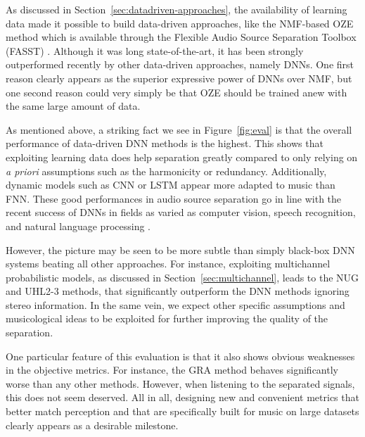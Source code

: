 As discussed in Section~\ref{sec:datadriven-approaches}, the availability of learning data made it possible to build data-driven approaches, like the NMF-based OZE method which is available through the Flexible Audio Source Separation Toolbox (FASST) \cite{salaun14,ozerov12}. Although it was long state-of-the-art, it has been strongly outperformed recently by other data-driven approaches, namely DNNs. One first reason clearly appears as the superior expressive power of DNNs over NMF, but one second reason could very simply be that OZE should be trained anew with the same large amount of data.

As mentioned above, a striking fact we see in Figure~\ref{fig:eval} is that the overall performance of data-driven DNN methods is the highest. This shows that exploiting learning data does help separation greatly compared to only relying on \textit{a priori} assumptions such as the harmonicity or redundancy. Additionally, dynamic models such as CNN or LSTM appear more adapted to music than FNN. These good performances in audio source separation go in line with the recent success of DNNs in fields as varied as computer vision, speech recognition, and natural language processing \cite{lecun15}.

However, the picture may be seen to be more subtle than simply black-box DNN systems beating all other approaches. For instance, exploiting multichannel probabilistic models, as discussed in Section~\ref{sec:multichannel}, leads to the NUG and UHL2-3 methods, that significantly outperform the DNN methods ignoring stereo information. In the same vein, we expect other specific assumptions and musicological ideas to be exploited for further improving the quality of the separation.

One particular feature of this evaluation is that it also shows obvious weaknesses in the objective metrics. For instance, the GRA method behaves significantly worse than any other methods. However, when listening to the separated signals, this does not seem deserved. All in all, designing new and convenient metrics that better match perception and that are specifically built for music on large datasets clearly appears as a desirable milestone.

